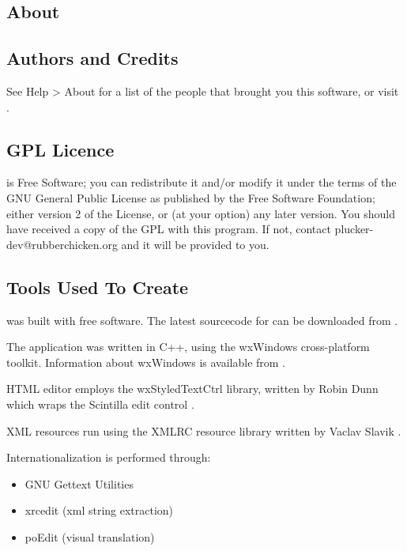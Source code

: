 \begin{helponly}

\chapter{About}\label{pd-about}

\section{Authors and Credits}\label{pd-credits}

See Help > About for a list of the people that brought you this software,
or visit \code{\brandingapplicationpublisherurl}.

\section{GPL Licence}\label{pd-gnu-licence}

\brandingapplicationdesktopname is Free Software; you can redistribute it and/or
modify it under the terms of the GNU General Public License
as published by the Free Software Foundation; either version 2
of the License, or (at your option) any later version.
You should have received a copy of the GPL with this program. 
If not, contact plucker-dev@rubberchicken.org and it will be 
provided to you.

\section{Tools Used To Create \brandingapplicationdesktopname}\label{pd-tools-to-make-plucker-desktop}

\brandingapplicationdesktopname was built with free software. The latest sourcecode for 
\brandingapplicationdesktopname can be downloaded from .

The \brandingapplicationdesktopname application was written in C++, using the wxWindows
cross-platform toolkit. Information about wxWindows is available from
.

HTML editor employs the wxStyledTextCtrl library, written by Robin Dunn
 which wraps the Scintilla edit control
.

XML resources run using the XMLRC resource library written by Vaclav Slavik
.

Internationalization is performed through:
\begin{itemize}
  \item GNU Gettext Utilities 
  \item xrcedit (xml string extraction) 
  \item poEdit (visual translation) 
\end{itemize}


\end{helponly}
